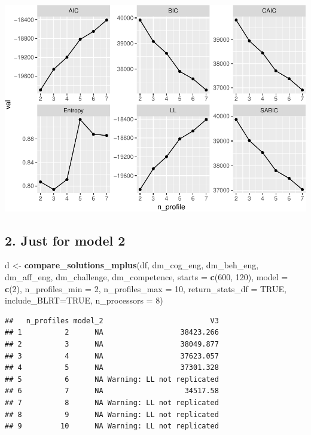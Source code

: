 \documentclass[]{msu-thesis}
\newenvironment{Shaded}{\begin{snugshade}}{\end{snugshade}}
\newcommand{\KeywordTok}[1]{\textcolor[rgb]{0.13,0.29,0.53}{\textbf{#1}}}
\newcommand{\DataTypeTok}[1]{\textcolor[rgb]{0.13,0.29,0.53}{#1}}
\newcommand{\DecValTok}[1]{\textcolor[rgb]{0.00,0.00,0.81}{#1}}
\newcommand{\StringTok}[1]{\textcolor[rgb]{0.31,0.60,0.02}{#1}}
\newcommand{\OtherTok}[1]{\textcolor[rgb]{0.56,0.35,0.01}{#1}}
\newcommand{\NormalTok}[1]{#1}
\theoremstyle{definition}
\theoremstyle{definition}
\theoremstyle{definition}
\theoremstyle{remark}
\begin{document}
\includegraphics{rosenberg-dissertation_files/figure-latex/compare-solutions-model1-1.pdf}

\subsection{2. Just for model 2}\label{just-for-model-2}

\begin{Shaded}
\begin{Highlighting}[]
\NormalTok{d <-}\StringTok{ }\KeywordTok{compare_solutions_mplus}\NormalTok{(df,  }
\NormalTok{                             dm_cog_eng, dm_beh_eng, dm_aff_eng, dm_challenge, dm_competence,}
                             \DataTypeTok{starts =} \KeywordTok{c}\NormalTok{(}\DecValTok{600}\NormalTok{, }\DecValTok{120}\NormalTok{),}
                             \DataTypeTok{model =} \KeywordTok{c}\NormalTok{(}\DecValTok{2}\NormalTok{),}
                             \DataTypeTok{n_profiles_min =} \DecValTok{2}\NormalTok{, }
                             \DataTypeTok{n_profiles_max =} \DecValTok{10}\NormalTok{,}
                             \DataTypeTok{return_stats_df =} \OtherTok{TRUE}\NormalTok{,}
                             \DataTypeTok{include_BLRT=}\OtherTok{TRUE}\NormalTok{,}
                             \DataTypeTok{n_processors =} \DecValTok{8}\NormalTok{)}
\end{Highlighting}
\end{Shaded}

\begin{verbatim}
##   n_profiles model_2                         V3
## 1          2      NA                  38423.266
## 2          3      NA                  38049.877
## 3          4      NA                  37623.057
## 4          5      NA                  37301.328
## 5          6      NA Warning: LL not replicated
## 6          7      NA                   34517.58
## 7          8      NA Warning: LL not replicated
## 8          9      NA Warning: LL not replicated
## 9         10      NA Warning: LL not replicated
\end{verbatim}
\end{document}
